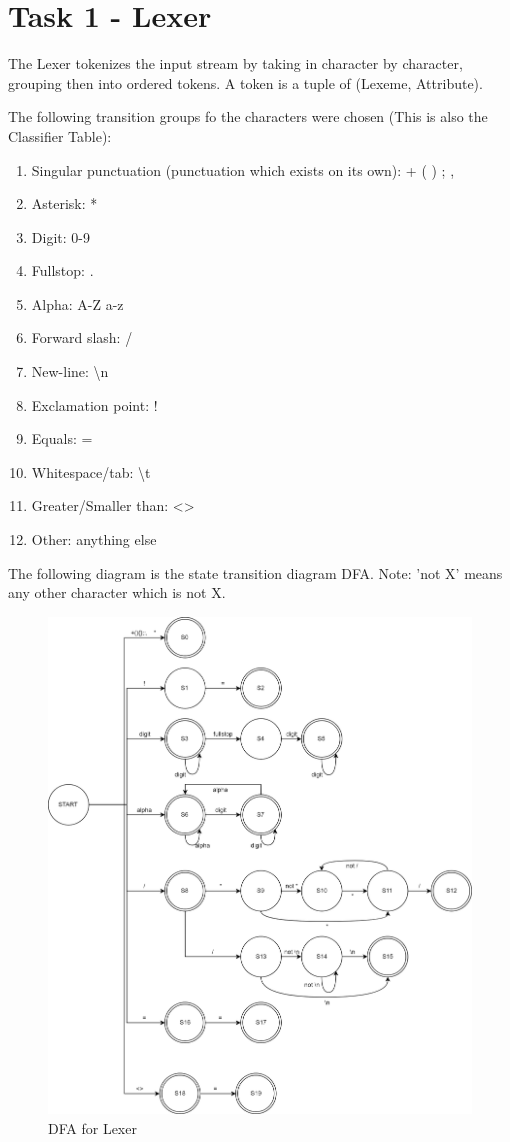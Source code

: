 \section{Task 1 - Lexer}
The Lexer tokenizes the input stream by taking in character by character, grouping then into ordered tokens. A token is a tuple of (Lexeme, Attribute).

The following transition groups fo the characters were chosen (This is also the Classifier Table):
\begin{enumerate}
	\item Singular punctuation (punctuation which exists on its own): + ( ) \textbraceleft \textbraceright ; ,
	\item Asterisk: *
	\item Digit: 0-9
	\item Fullstop: .
	\item Alpha: A-Z a-z \textunderscore
	\item Forward slash: /
	\item New-line: \textbackslash n
	\item Exclamation point: !
	\item Equals: =
	\item Whitespace/tab:   \textbackslash t
	\item Greater/Smaller than: \textless  \textgreater
	\item Other: anything else
\end{enumerate}

The following diagram is the state transition diagram DFA. Note: 'not X' means any other character which is not X.
\begin{figure}[H]
	\centering
	\includegraphics[width=\textwidth]{Images/Q1_StateTransitionDiagram.png}
	\caption{DFA for Lexer}
\end{figure}

